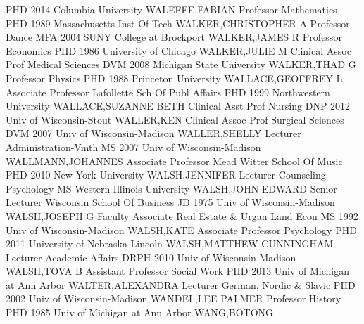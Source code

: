 \documentclass[
]{article}
\begin{document}
\textbar PHD 2014 Columbia University \textbar{} 
\textbar WALEFFE,FABIAN \textbar Professor \textbar Mathematics
\textbar PHD 1989 Massachusetts Inst Of Tech \textbar{} 
\textbar WALKER,CHRISTOPHER A \textbar Professor \textbar Dance
\textbar MFA 2004 SUNY College at Brockport \textbar{} 
\textbar WALKER,JAMES R \textbar Professor \textbar Economics
\textbar PHD 1986 University of Chicago \textbar{} 
\textbar WALKER,JULIE M \textbar Clinical Assoc Prof \textbar Medical
Sciences \textbar DVM 2008 Michigan State University \textbar{}
 \textbar WALKER,THAD G \textbar Professor \textbar Physics
\textbar PHD 1988 Princeton University \textbar{} 
\textbar WALLACE,GEOFFREY L. \textbar Associate Professor
\textbar Lafollette Sch Of Publ Affairs \textbar PHD 1999 Northwestern
University \textbar{}  \textbar WALLACE,SUZANNE BETH
\textbar Clinical Asst Prof \textbar Nursing \textbar DNP 2012 Univ of
Wisconsin-Stout \textbar{}  \textbar WALLER,KEN
\textbar Clinical Assoc Prof \textbar Surgical Sciences \textbar DVM
2007 Univ of Wisconsin-Madison \textbar{} 
\textbar WALLER,SHELLY \textbar Lecturer \textbar Administration-Vmth
\textbar MS 2007 Univ of Wisconsin-Madison \textbar{} 
\textbar WALLMANN,JOHANNES \textbar Associate Professor \textbar Mead
Witter School Of Music \textbar PHD 2010 New York University \textbar{}
 \textbar WALSH,JENNIFER \textbar Lecturer
\textbar Counseling Psychology \textbar MS Western Illinois University
\textbar{}  \textbar WALSH,JOHN EDWARD \textbar Senior
Lecturer \textbar Wisconsin School Of Business \textbar JD 1975 Univ of
Wisconsin-Madison \textbar{}  \textbar WALSH,JOSEPH G
\textbar Faculty Associate \textbar Real Estate \& Urgan Land Econ
\textbar MS 1992 Univ of Wisconsin-Madison \textbar{} 
\textbar WALSH,KATE \textbar Associate Professor \textbar Psychology
\textbar PHD 2011 University of Nebraska-Lincoln \textbar{} 
\textbar WALSH,MATTHEW CUNNINGHAM \textbar Lecturer \textbar Academic
Affairs \textbar DRPH 2010 Univ of Wisconsin-Madison \textbar{}
 \textbar WALSH,TOVA B \textbar Assistant Professor
\textbar Social Work \textbar PHD 2013 Univ of Michigan at Ann Arbor
\textbar{}  \textbar WALTER,ALEXANDRA \textbar Lecturer
\textbar German, Nordic \& Slavic \textbar PHD 2002 Univ of
Wisconsin-Madison \textbar{}  \textbar WANDEL,LEE PALMER
\textbar Professor \textbar History \textbar PHD 1985 Univ of Michigan
at Ann Arbor \textbar{}  \textbar WANG,BOTONG
\end{document}
